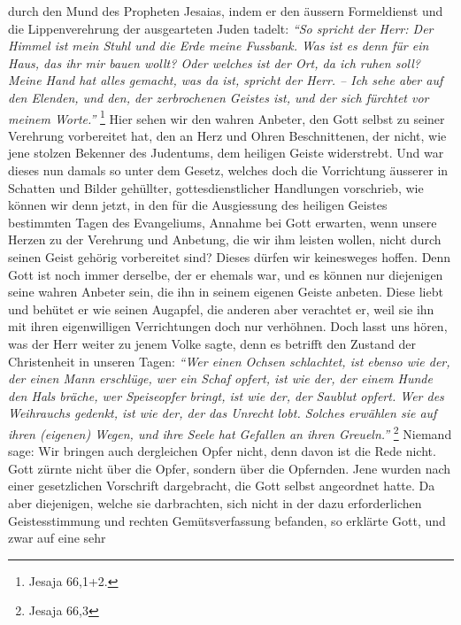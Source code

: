 durch den Mund des Propheten Jesaias, indem er den
äussern Formeldienst und
die Lippenverehrung der ausgearteten Juden tadelt:
\textit{"`So spricht der Herr: Der
Himmel ist mein Stuhl und die Erde meine Fussbank. Was ist es denn für ein
Haus, das ihr mir bauen wollt? Oder welches ist der Ort, da ich ruhen soll?
Meine Hand hat alles gemacht, was da ist, spricht der Herr. -- Ich sehe aber auf
den Elenden, und den, der zerbrochenen Geistes ist, und der sich fürchtet vor
meinem Worte."'}
\footnote{Jesaja 66,1+2.}
Hier sehen wir den wahren Anbeter, den
Gott selbst zu seiner Verehrung vorbereitet hat, den an Herz und Ohren
Beschnittenen, der nicht, wie jene stolzen Bekenner des
Judentums, dem
heiligen Geiste widerstrebt. Und war dieses nun damals
so unter dem Gesetz, welches doch die Vorrichtung
äusserer
in Schatten und
Bilder gehüllter, gottesdienstlicher Handlungen vorschrieb, wie können wir denn
jetzt, in den für die Ausgiessung des heiligen Geistes bestimmten Tagen des
Evangeliums, Annahme bei Gott erwarten, wenn unsere Herzen
zu der Verehrung und
Anbetung, die wir ihm leisten wollen, nicht durch seinen Geist gehörig
vorbereitet sind? Dieses dürfen wir keinesweges hoffen. Denn Gott ist noch immer
derselbe, der er ehemals war, und es können nur
diejenigen seine wahren Anbeter sein, die ihn in seinem
eigenen Geiste anbeten.
Diese liebt und behütet er wie seinen Augapfel, die anderen aber verachtet er,
weil sie ihn mit ihren eigenwilligen Verrichtungen doch nur verhöhnen. Doch
lasst uns hören, was der Herr weiter zu jenem Volke sagte, denn es betrifft den
Zustand der Christenheit in unseren Tagen:
\textit{"`Wer einen Ochsen schlachtet, ist
ebenso wie der, der einen Mann erschlüge, wer ein Schaf opfert, ist wie der, der
einem
Hunde den Hals bräche, wer Speiseopfer bringt, ist wie der, der Saublut
opfert. Wer des Weihrauchs gedenkt, ist wie der, der
das Unrecht lobt. Solches erwählen sie auf ihren (eigenen) Wegen, und ihre Seele
hat Gefallen an ihren Greueln."'}
\footnote{Jesaja 66,3}
Niemand sage: Wir bringen
auch dergleichen Opfer nicht, denn davon ist die Rede nicht. Gott zürnte nicht
über die Opfer, sondern über die Opfernden. Jene wurden nach einer gesetzlichen
Vorschrift dargebracht, die Gott selbst angeordnet hatte. Da aber diejenigen,
welche sie darbrachten, sich nicht in der dazu erforderlichen Geistesstimmung
und rechten Gemütsverfassung befanden, so erklärte Gott, und zwar auf eine sehr
